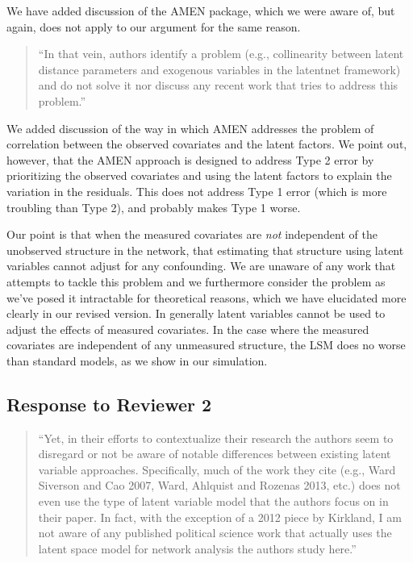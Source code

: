 We have added discussion of the AMEN package, which we were aware of,
but again, does not apply to our argument for the same reason.

\begin{quote}
``In that vein, authors identify a problem (e.g., collinearity between
latent distance parameters and exogenous variables in the latentnet
framework) and do not solve it nor discuss any recent work that tries to
address this problem.''
\end{quote}

We added discussion of the way in which AMEN addresses the problem of correlation between the observed covariates and the latent factors. We point out, however, that the AMEN approach is designed to address Type 2 error by prioritizing the observed covariates and using the latent factors to explain the variation in the residuals. This does not address Type 1 error (which is more troubling than Type 2), and probably makes Type 1 worse.


Our point is that when the measured covariates are \emph{not}
independent of the unobserved structure in the network, that estimating
that structure using latent variables cannot adjust for any confounding.
We are unaware of any work that attempts to tackle this problem and we
furthermore consider the problem as we've posed it intractable for
theoretical reasons, which we have elucidated more clearly in our
revised version. In generally latent variables cannot be used to adjust
the effects of measured covariates. In the case where the measured
covariates are independent of any unmeasured structure, the LSM does no
worse than standard models, as we show in our simulation.

\subsection{Response to Reviewer 2}\label{response-to-reviewer-2}

\begin{quote}
``Yet, in their efforts to contextualize their research the authors seem
to disregard or not be aware of notable differences between existing
latent variable approaches. Specifically, much of the work they cite
(e.g., Ward Siverson and Cao 2007, Ward, Ahlquist and Rozenas 2013,
etc.) does not even use the type of latent variable model that the
authors focus on in their paper. In fact, with the exception of a 2012
piece by Kirkland, I am not aware of any published political science
work that actually uses the latent space model for network analysis the
authors study here.''
\end{quote}

